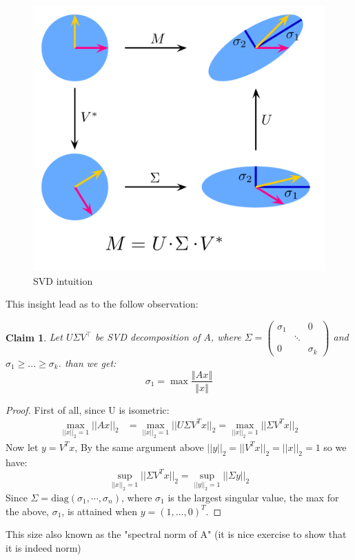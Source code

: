 \documentclass[11pt, oneside]{article}   	%
\newtheorem{claim}[lemma]{Claim}
\begin{document}
\begin{figure}[h!]
  \centering
    \includegraphics[scale=0.6]{svd_intuition.png}  
   \caption{SVD intuition}
\end{figure}

This insight lead as to the follow observation:
\begin{claim}
Let $U\Sigma V^{\top}$ be SVD decomposition of $A$, where $\Sigma=\left(\begin{array}{ccc}
\sigma_{1} &  & 0\\
 & \ddots\\
0 &  & \sigma_{k}
\end{array}\right)$ and $\sigma_{1}\ge...\ge\sigma_{k}$. than we get: $$\sigma_{1}=\max\frac{\left\Vert Ax\right\Vert }{\left\Vert x\right\Vert }$$
\end{claim}

\begin{proof}
First of all, since U is isometric:
\begin{align*}\max_{||x||_2 =1}||Ax||_2 & = \max_{||x||_2 =1}||U\Sigma V^Tx||_2 = \max_{||x||_2 =1}||\Sigma V^Tx||_2\end{align*}
Now let $y=V^{T}x$, By the same argument above $||y||_2 = ||V^Tx||_2 = ||x||_2 = 1$ so we have: $$\sup_{||x||_2 =1}||\Sigma V^Tx||_2 = \sup_{||y||_2 =1}||\Sigma y||_2$$
Since $\Sigma = \mbox{diag}(\sigma_1, \cdots, \sigma_n)$, where $\sigma_1$ is the largest singular value, the max for the above, $\sigma_1$, is attained when $y=(1,...,0)^{T}$.
\end{proof}

This size also known as the "spectral norm of A" (it is nice exercise to show that it is indeed norm)
\end{document}
